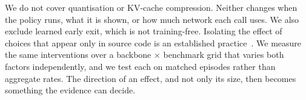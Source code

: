 We do not cover quantisation or KV-cache compression. Neither changes when the
policy runs, what it is shown, or how much network each call uses. We also
exclude learned early exit, which is not training-free. Isolating the effect
of choices that appear only in source code is an established
practice~\cite{bagoftricks_cnn, bagoftricks_llm}. We measure the same
interventions over a backbone $\times$ benchmark grid that varies both factors
independently, and we test each on matched episodes rather than aggregate
rates. The direction of an effect, and not only its size, then becomes
something the evidence can decide.
